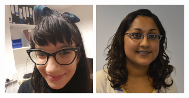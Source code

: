 \documentclass{beamer}
\begin{document}
\begin{frame}
\begin{columns}
\begin{column}{.2\textwidth}
\begin{center}
                \includegraphics[width=.8\textwidth]{img/fellows/olivia-guest_thumb.png}
                \vspace{.2cm}
                \includegraphics[width=.8\textwidth]{img/fellows/rebecca-wilson_thumb.png}
            \end{center}
        \end{column}


\end{columns}
\end{frame}
\end{document}
